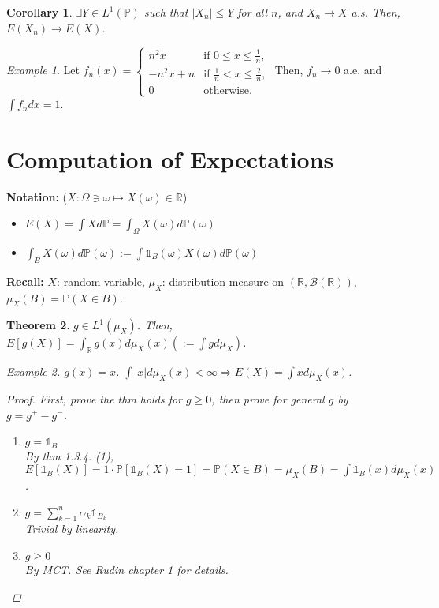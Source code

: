 \documentclass[12pt]{report}
\theoremstyle{break}
\newtheorem{thm}{Theorem}[section] %
\theoremstyle{newdef}
\newtheorem{cor}[thm]{Corollary}
\theoremstyle{remark}
\newtheorem*{exmp}{Example} %
\begin{document}
\begin{cor}
$\exists Y \in L^1(\mathbb{P})$ such that $|X_n| \leq Y$ for all $n$, and $X_n \rightarrow X$ a.s.
Then, $E(X_n) \rightarrow E(X)$.
\end{cor}

\begin{exmp}
Let $f_n(x) = 
\begin{cases}
n^2x & \text{if } 0 \leq x \leq \frac{1}{n},\\
-n^2x + n & \text{if } \frac{1}{n} < x \leq \frac{2}{n},\\
0 & \text{otherwise}.
\end{cases}
$
Then, $f_n \rightarrow 0$ a.e. and $\int f_n dx = 1$.
\end{exmp}

\section{Computation of Expectations}

\textbf{Notation:} ($X : \Omega \ni \omega \mapsto X(\omega) \in \mathbb{R}$)
\begin{itemize}
\item $E(X) = \int X d\mathbb{P} = \int_\Omega X(\omega) d\mathbb{P}(\omega)$
\item $\int_B X(\omega)d\mathbb{P}(\omega) := \int \mathbb{1}_B(\omega) X(\omega) d\mathbb{P}(\omega)$
\end{itemize}

\textbf{Recall:} $X$: random variable, $\mu_X$: distribution measure on $(\mathbb{R}, \mathcal{B}(\mathbb{R}))$,
$\mu_X(B) = \mathbb{P}(X \in B)$.


\begin{thm}
$g \in L^1(\mu_X)$.
Then, 
$E[g(X)] = \int_\mathbb{R} g(x)d\mu_X(x) (:= \int g d\mu_X)$.

\begin{exmp}
$g(x) = x$.
$\int |x| d\mu_X(x) < \infty \Rightarrow E(X) = \int xd\mu_X(x)$.
\end{exmp}

\begin{proof}
First, prove the thm holds for $g \geq 0$, then prove for general $g$ by $g = g^+ - g^-$.
\begin{enumerate}[label = (\arabic*)]
\item $g = \mathbb{1}_B$\\
By thm 1.3.4. (1), $E[\mathbb{1}_B(X)] = 1 \cdot \mathbb{P}[\mathbb{1}_B(X) = 1] = \mathbb{P}(X\in B) = \mu_X(B)
= \int \mathbb{1}_B(x) d\mu_X(x)$.
\item $g = \sum_{k=1}^n \alpha_k \mathbb{1}_{B_k}$\\
Trivial by linearity.
\item $g \geq 0$\\
By MCT.
See \textit{Rudin} chapter 1 for details.
\end{enumerate}
\end{proof}
\end{thm}
\end{document}
